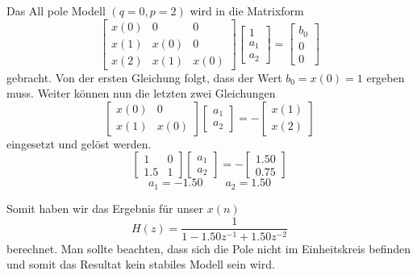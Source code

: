 \begin{beispiel}
Das All pole Modell $(q=0,p=2)$ wird in die Matrixform
\begin{equation}\left[\begin{array}{ccc}
x(0) & 0 & 0 \\
x(1) & x(0) & 0 \\
x(2) & x(1) & x(0)
\end{array}\right]\left[\begin{array}{c}
1 \\
a_1 \\
a_2
\end{array}\right]=\left[\begin{array}{c}
b_0 \\
0 \\
0
\end{array}\right]\end{equation}
gebracht. 
Von der ersten Gleichung folgt, dass der Wert $b_0 = x(0)=1$ ergeben muss. 
Weiter können nun die letzten zwei Gleichungen
\begin{equation}\left[\begin{array}{ll}
x(0) & 0 \\
x(1) & x(0)
\end{array}\right]\left[\begin{array}{l}
a_1 \\
a_2
\end{array}\right]=-\left[\begin{array}{l}
x(1) \\
x(2)
\end{array}\right]\end{equation}
eingesetzt und gelöst werden.
\begin{equation}\left[\begin{array}{cc}
1 & 0 \\
1.5 & 1
\end{array}\right]\left[\begin{array}{l}
a_1 \\
a_2
\end{array}\right]=-\left[\begin{array}{c}
1.50 \\
0.75
\end{array}\right]\end{equation}
\begin{equation}
a_1=-1.50 \quad  \quad a_2=1.50
\end{equation}

Somit haben wir das Ergebnis für unser $x(n)$ 
\begin{equation}
H(z)=\frac{1}{1-1.50 z^{-1}+1.50 z^{-2}}
\end{equation}
berechnet.
Man sollte beachten, dass sich die Pole nicht im Einheitskreis befinden und somit das Resultat kein stabiles Modell sein wird.


\end{beispiel}
